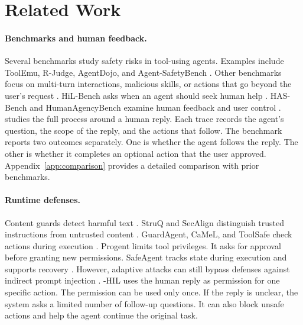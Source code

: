\section{Related Work}
\label{sec:related}

\paragraph{Benchmarks and human feedback.}
Several benchmarks study safety risks in tool-using agents. Examples include
ToolEmu, R-Judge, AgentDojo, and Agent-SafetyBench
\citep{ruan2024toolemu,yuan2024rjudge,debenedetti2024agentdojo,zhang2024agentsafetybench}.
Other benchmarks focus on multi-turn interactions, malicious skills, or actions
that go beyond the user's request
\citep{li2026unsafer,ning2026skillharm,jin2026skillsafetybench,qu2026overeager}.
HiL-Bench asks when an agent should seek human help \citep{trinh2026hilbench}.
HAS-Bench and HumanAgencyBench examine human feedback and user control
\citep{wu2026hasbench,sturgeon2025humanagencybench}.
\bench{} studies the full process around a human reply. Each trace records the
agent's question, the scope of the reply, and the actions that follow. The
benchmark reports two outcomes separately. One is whether the agent follows the
reply. The other is whether it completes an optional action that the user
approved. Appendix~\ref{app:comparison} provides a detailed comparison with
prior benchmarks.

\paragraph{Runtime defenses.}
Content guards detect harmful text
\citep{inan2023llamaguard,han2024wildguard,zeng2024shieldgemma}.
StruQ and SecAlign distinguish trusted instructions from untrusted content
\citep{chen2025struq,chen2025secalign}.
GuardAgent, CaMeL, and ToolSafe check actions during execution
\citep{xiang2025guardagent,debenedetti2025camel,toolsafe2026}.
Progent limits tool privileges. It asks for approval before granting new
permissions. SafeAgent tracks state during execution and supports recovery
\citep{shi2025progent,liu2026safeagent}.
However, adaptive attacks can still bypass defenses against indirect prompt
injection \citep{zhan2025adaptive}.
\sail{}-HIL uses the human reply as permission for one specific action. The
permission can be used only once. If the reply is unclear, the system asks a
limited number of follow-up questions. It can also block unsafe actions and
help the agent continue the original task.
